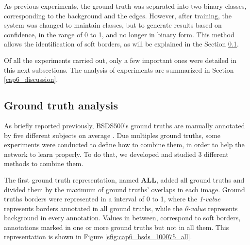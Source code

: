 As previous experiments, the ground truth was separated into two binary classes, corresponding to the background and the edges.
However, after training, the system was changed to maintain classes, but to generate results based on confidence, in the range of 0 to 1, and no longer in binary form.
This method allows the identification of soft borders, as will be explained in the Section \ref{ssec:groundtruth_analysis}.%

Of all the experiments carried out, only a few important ones were detailed in this next subsections.
The analysis of experiments are summarized in Section \ref{cap6_discussion}.

\subsection{Ground truth analysis}
\label{ssec:groundtruth_analysis}

As briefly reported previously, BSDS500's ground truths are manually annotated by five different subjects on average \cite{amfm_pami2011}.
Due multiples ground truths, some experiments were conducted to define how to combine them, in order to help the network to learn properly.
To do that, we developed and studied 3 different methods to combine them.

The first ground truth representation, named \textbf{ALL}, added all ground truths and divided them by the maximum of ground truths' overlaps in each image.
Ground truths borders were represented in a interval of 0 to 1, where the \textit{1-value} represents borders annotated in all ground truths, while the \textit{0-value} represents background in every annotation.
Values in between, correspond to soft borders, annotations marked in one or more ground truths but not in all them.
This representation is shown in Figure \ref{sfig:cap6_bsds_100075_all}.

